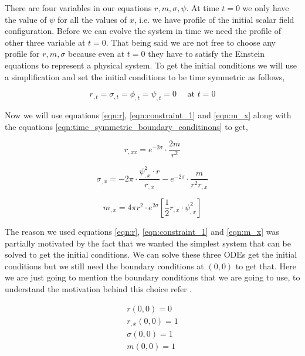 There are four variables in our equations $r,m,\sigma,\psi$. At time $t=0$ we only have the value of $\psi$ for all the values of $x$, i.e. we have profile of the initial scalar field configuration. Before we can evolve the system in time we need the profile of other three variable at $t=0$. That being said we are not free to choose any profile for $r,m,\sigma$ because even at $t=0$ they have to satisfy the Einstein equations to represent a physical system.
To get the initial conditions we will use a simplification and set the initial conditions to be time symmetric as follows,

\begin{equation}
    r_{, t}=\sigma_{, t}=\phi_{, t}=\psi_{, t}=0 \quad \text { at } t=0
    \label{eqn:time_symmetric_boundary_conditinons}
\end{equation}

Now we will use equations \ref{eqn:r}, \ref{eqn:constraint_1} and \ref{eqn:m_x} along with the equations \ref{eqn:time_symmetric_boundary_conditinons} to get,


\begin{equation}
    r_{, x x}=e^{-2 \sigma} \cdot \frac{2 m}{r^{2}}
    \label{eqn:r_chap3}
\end{equation}


\begin{equation}
    \sigma_{, x}= -2 \pi \cdot  \frac{\psi_{, x}^{2} \cdot r}{r_{,x}}- e^{-2 \sigma} \cdot \frac{ m}{r^{2}r_{, x}}
    \label{eqn:sigma_chap3}
\end{equation}

\begin{equation}
    m_{, x}=4 \pi r^{2} \cdot e^{2 \sigma}\left[\frac{1}{2} r_{, x} \cdot \psi_{, x}^{2} \right]
\end{equation}

The reason we used equations \ref{eqn:r}, \ref{eqn:constraint_1} and \ref{eqn:m_x} was partially motivated by the fact that we wanted the simplest system that can be solved to get the initial conditions.
We can solve these three ODEs get the initial conditions but we still need the boundary conditions at $(0,0)$ to get that. Here we are just going to mention the boundary conditions that we are going to use, to understand the motivation behind this choice refer \citep{Guo:2013dha}.

\begin{eqnarray}
    r(0 ,0) = 0  \\
    r_{,x}(0 ,0) = 1  \\
    \sigma(0 ,0) = 1  \\
    m(0 ,0) = 1
\end{eqnarray}

